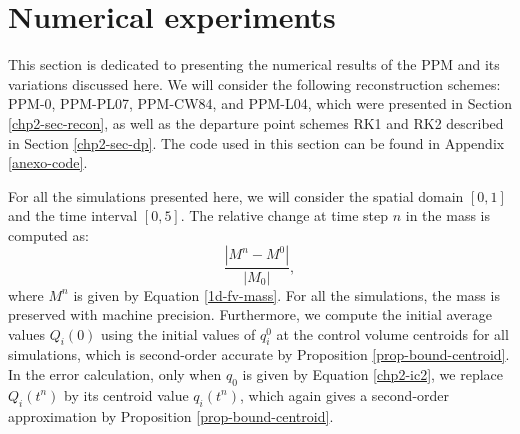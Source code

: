 \section{Numerical experiments}
\label{chp2-sec-numerical-exp}
This section is dedicated to presenting the numerical results of the PPM and 
its variations discussed here. We will consider the following reconstruction
schemes: PPM-0, PPM-PL07, PPM-CW84, and PPM-L04, which were presented in Section
\ref{chp2-sec-recon}, as well as the departure point schemes RK1 and RK2 described 
in Section \ref{chp2-sec-dp}. The code used in this section can be found in Appendix \ref{anexo-code}.

For all the simulations presented here, we will consider the spatial domain $[0,1]$ and the time interval $[0,5]$.
The relative change at time step $n$ in the mass is computed as:
\begin{equation*}
	\frac{|M^n-M^0|}{|M_0|},
\end{equation*}
where $M^n$ is given by Equation \eqref{1d-fv-mass}. For all the simulations, the
mass is preserved with machine precision. Furthermore,
we compute the initial average values $Q_i(0)$ using
the initial values of $q^0_i$ at the control volume centroids for all simulations,
which is second-order accurate by Proposition \ref{prop-bound-centroid}. 
In the error calculation, only when $q_0$ is given by Equation \eqref{chp2-ic2},
we replace $Q_{i}(t^n)$ by its centroid value $q_{i}(t^n)$, which again gives
a second-order approximation by Proposition \ref{prop-bound-centroid}.

